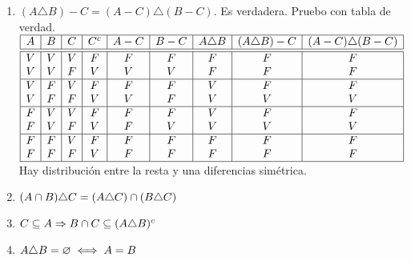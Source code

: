 \documentclass[12pt,a4paper, spanish]{article}
\begin{document}
\begin{enumerate}[label=\roman*)]
	\item $(A \triangle B) - C = (A-C) \triangle (B - C)$. Es verdadera. Pruebo con tabla de verdad.\\
	      $
		      \begin{array}{|c|c|c|c|c|c|c|c|c|}
			      \hline
			      A & B & C & C^c & A - C & B - C & A \triangle B & (A \triangle B) - C & (A - C) \triangle (B - C) \\
			      \hline  \hline
			      V & V & V & F   & F     & F     & F             & F                   & F                         \\
			      V & V & F & V   & V     & V     & F             & F                   & F                         \\
			      \hline
			      V & F & V & F   & F     & F     & V             & F                   & F                         \\
			      V & F & F & V   & V     & F     & V             & V                   & V                         \\
			      \hline
			      F & V & V & F   & F     & F     & V             & F                   & F                         \\
			      F & V & F & V   & F     & V     & V             & V                   & V                         \\
			      \hline
			      F & F & V & F   & F     & F     & F             & F                   & F                         \\
			      F & F & F & V   & F     & F     & F             & F                   & F                         \\
			      \hline
		      \end{array}
	      $\\
	      Hay distribución entre la resta y una diferencias simétrica.

	\item $(A \cap B) \triangle C = (A \triangle C) \cap (B \triangle C)$
	\item $C \subseteq A \Rightarrow B \cap C \subseteq (A \triangle B)^c$
	\item $A \triangle B = \varnothing \iff A = B$
\end{enumerate}
\end{document}
